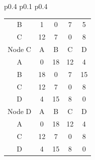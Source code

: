 \documentclass{article}
\begin{document}
\begin{tabular}{p{0.4\linewidth} p{0.1\linewidth} p{0.4\linewidth}}
\begin{tabular}{c|c|c|c|c}
        B & \color{red}1 & 0 & 7 & \color{red}5 \\
        C & 12 & 7 & 0 & 8 \\
        \hline
        \hline
        Node C & A & B & C & D \\
        \hline
        A & 0 & 18 & 12 & 4 \\
        B & 18 & 0 & 7 & 15 \\
        C & 12 & 7 & 0 & 8 \\
        D & 4 & 15 & 8 & 0 \\
        \hline
        \hline
        Node D & A & B & C & D \\
        \hline
        A & 0 & 18 & 12 & 4 \\
        C & 12 & 7 & 0 & 8 \\
        D & 4 & 15 & 8 & 0 \\
        \hline
    \end{tabular}
\end{tabular}
\end{document}
